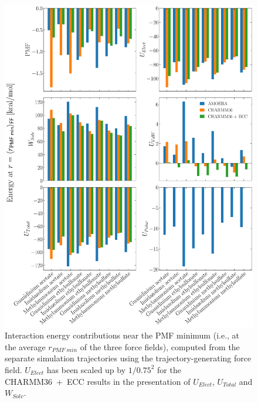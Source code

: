 \documentclass[journal=jacsat,articletitle=true,manuscript=suppinfo,layout=onecolumn]{achemso}
\begin{document}
    \begin{figure}[H]
    \begin{center}
        \includegraphics[width=0.9\columnwidth]{images/energy_cont_bar_plots.pdf}
        \caption{Interaction energy contributions near the PMF minimum (i.e., at the average $r_{PMF \; min}$ of the three force fields), computed from the separate simulation trajectories using the trajectory-generating force field. $U_{Elect}$ has been scaled up by $1/0.75^2$ for the CHARMM36~+~ECC results in the presentation of $U_{Elect}$, $U_{Total}$ and $W_{Solv}$.}
        \label{fig:energy_cont_bar_plots}
    \end{center}
    \end{figure}
\end{document}

